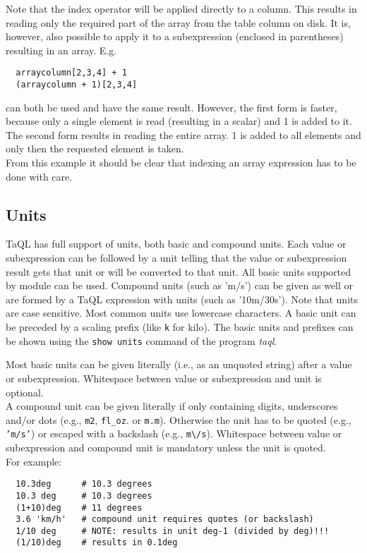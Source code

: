Note that the index operator will be applied directly
to a column. This results in reading only the required part of the
array from the table column on disk.
It is, however, also possible to apply it to a
subexpression (enclosed in parentheses) resulting in an array.
E.g.
\begin{verbatim}
  arraycolumn[2,3,4] + 1
  (arraycolumn + 1)[2,3,4]
\end{verbatim}
can both be used and have the same result. However, the first
form is faster, because only a single element is read
(resulting in a scalar) and 1 is added to it.
The second form results in reading the entire array.
1 is added to all elements and only then the requested element is taken.
\\From this example it should be clear that indexing an array
expression has to be done with care.

\subsection{\label{TAQL:UNITS}Units}
TaQL has full support of units, both basic and compound units.
Each value or subexpression can be followed by a unit telling that the 
value or subexpression result gets that unit or will be converted to
that unit. All basic units supported by module
can be used. Compound units (such as 'm/s') can be given as well or
are formed by a TaQL expression with units (such as '10m/30s').
Note that units are case sensitive. Most common units use
lowercase characters.
A basic unit can be preceded by a scaling prefix (like \texttt{k} for kilo).
The basic units and prefixes can be shown using the
{\tt show units} command of the program {\em taql}.

Most basic units can be given literally (i.e., as an unquoted string)
after a value or subexpression. Whitespace between value or
subexpression and unit is optional.
\\A compound unit can be given literally if only containing digits,
underscores and/or dots (e.g., \texttt{m2}, \texttt{fl\_oz}. or \texttt{m.m}).
Otherwise the unit has to be quoted (e.g., \texttt{'m/s'}) or escaped
with a backslash (e.g., \texttt{m}\verb+\+\texttt{/s}).
Whitespace between value or subexpression and compound unit is
mandatory unless the unit is quoted.
\\For example:
\begin{verbatim}
  10.3deg      # 10.3 degrees
  10.3 deg     # 10.3 degrees
  (1+10)deg    # 11 degrees
  3.6 'km/h'   # compound unit requires quotes (or backslash)
  1/10 deg     # NOTE: results in unit deg-1 (divided by deg)!!!
  (1/10)deg    # results in 0.1deg
\end{verbatim}

